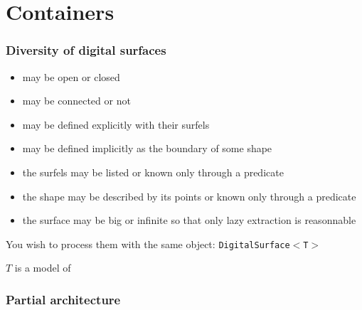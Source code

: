 \documentclass[pdftex,francais]{beamer}
\begin{document}
\section{Containers}

\begin{frame}%
  \frametitle{Diversity of digital surfaces}

  \begin{itemize}
  \item may be open or closed
  \item may be connected or not
  \item may be defined explicitly with their surfels
  \item may be defined implicitly as the boundary of some shape
  \item the surfels may be listed or known only through a predicate
  \item the shape may be described by its points or known only through a predicate
  \item the surface may be big or infinite so that only lazy extraction is reasonnable
  \end{itemize}

  \small
  You wish to process them with the same object: {\tt \alert{DigitalSurface}$<$T$>$}

  $T$ is a model of \href{http://liris.cnrs.fr/dgtal/doc/nightly/structDGtal_1_1CDigitalSurfaceContainer.html}{\texttt{}}
\end{frame}

\begin{frame}%
  \frametitle{Partial architecture}

\end{frame}
\end{document}
